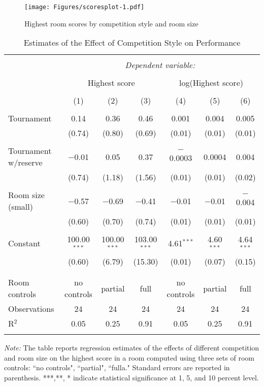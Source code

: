 \documentclass[10pt, titlepage]{article}
\begin{document}
\begin{figure}
\caption{Highest room scores by competition style and room size}
\label{scores plot}
\texttt{[image: Figures/scoresplot-1.pdf]}
\end{figure}

\begin{table}
\centering
\caption{Estimates of the Effect of Competition Style on Performance}\label{scores table}
\begin{tabular}{@{}lcccccc}
\\[-1.8ex]\hline 
\hline \\[-1.8ex] 
 & \multicolumn{6}{c}{\textit{Dependent variable:}} \\ 
\cline{2-7} 
\\[-1.8ex] & \multicolumn{3}{c}{Highest score} & \multicolumn{3}{c}{log(Highest score)} \\ 
\\[-1.8ex] & (1) & (2) & (3) & (4) & (5) & (6)\\ 
\hline \\[-1.8ex] 
 Tournament & 0.14 & 0.36 & 0.46 & 0.001 & 0.004 & 0.005 \\ 
  & (0.74) & (0.80) & (0.69) & (0.01) & (0.01) & (0.01) \\ 
  & & & & & & \\ 
 Tournament w/reserve & $-$0.01 & 0.05 & 0.37 & $-$0.0003 & 0.0004 & 0.004 \\ 
  & (0.74) & (1.18) & (1.56) & (0.01) & (0.01) & (0.02) \\ 
  & & & & & & \\ 
 Room size (small) & $-$0.57 & $-$0.69 & $-$0.41 & $-$0.01 & $-$0.01 & $-$0.004 \\ 
  & (0.60) & (0.70) & (0.74) & (0.01) & (0.01) & (0.01) \\ 
  & & & & & & \\ 
 Constant & 100.00$^{***}$ & 100.00$^{***}$ & 103.00$^{***}$ & 4.61$^{***}$ & 4.60$^{***}$ & 4.64$^{***}$ \\ 
  & (0.60) & (6.79) & (15.30) & (0.01) & (0.07) & (0.15) \\ 
  & & & & & & \\ 
\hline \\[-1.8ex] 
Room controls & no controls & partial & full & no controls & partial & full \\ 
Observations & 24 & 24 & 24 & 24 & 24 & 24 \\ 
R$^{2}$ & 0.05 & 0.25 & 0.91 & 0.05 & 0.25 & 0.91 \\ 
\hline 
\hline \\[-1.8ex] 
\end{tabular} 
\begin{minipage}{1.000000\textwidth}
\footnotesize\emph{Note:} The table reports regression estimates of the effects of different competition and room size on the highest score in a room computed using three sets of room controls: ``no controls", ``partial", ``fulla." Standard errors are reported in parenthesis. ***,**, * indicate statistical significance at 1, 5, and 10 percent level.
\end{minipage}
\end{table}
\end{document}
